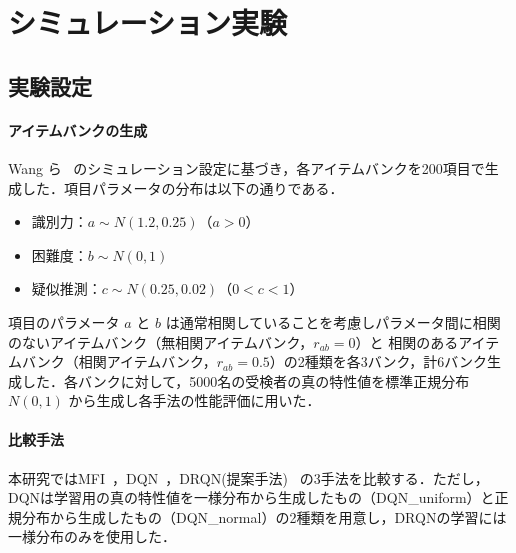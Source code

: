 \documentclass[dvipdfmx,a4j]{jarticle}
\begin{document}
\section{シミュレーション実験}

\subsection{実験設定}

\paragraph{アイテムバンクの生成}

Wang ら~\cite{wang2024} のシミュレーション設定に基づき，各アイテムバンクを200項目で生成した．項目パラメータの分布は以下の通りである．
\begin{itemize}
\item 識別力：$a \sim N(1.2, 0.25)$（$a > 0$）
\item 困難度：$b \sim N(0, 1)$
\item 疑似推測：$c \sim N(0.25, 0.02)$（$0 < c < 1$）
\end{itemize}

項目のパラメータ $a$ と $b$ は通常相関していることを考慮しパラメータ間に相関のないアイテムバンク（無相関アイテムバンク，$r_{ab}=0$）と 相関のあるアイテムバンク（相関アイテムバンク，$r_{ab}=0.5$）の2種類を各3バンク，計6バンク生成した．各バンクに対して，5000名の受検者の真の特性値を標準正規分布 $N(0,1)$ から生成し各手法の性能評価に用いた．

\paragraph{比較手法}


本研究ではMFI~\cite{lord1980}，DQN~\cite{wang2024}，DRQN(提案手法)~\cite{hausknecht2015} の3手法を比較する．ただし，DQNは学習用の真の特性値を一様分布から生成したもの（DQN\_uniform）と正規分布から生成したもの（DQN\_normal）の2種類を用意し，DRQNの学習には一様分布のみを使用した．
\end{document}
